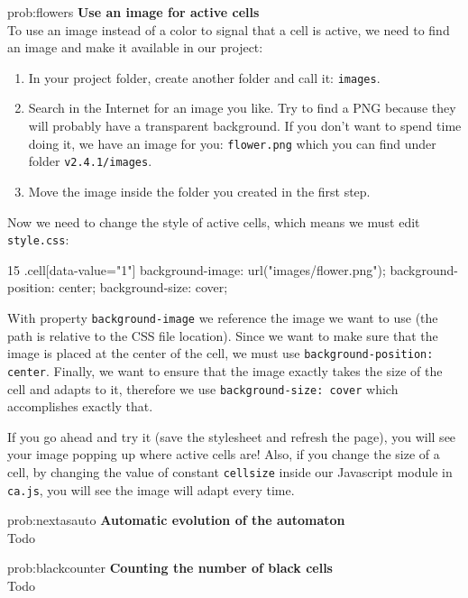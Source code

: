 \begin{sol}{prob:flowers}
\textbf{Use an image for active cells}\\
To use an image instead of a color to signal that a cell is active, we need to find an image and
make it available in our project:
\begin{enumerate}
  \item In your project folder, create another folder and call it: \texttt{images}.
  \item Search in the Internet for an image you like. Try to find a PNG because they will probably have
    a transparent background. If you don't want to spend time doing it, we have an image for you:
    \texttt{flower.png} which you can find under folder \texttt{v2.4.1/images}.
  \item Move the image inside the folder you created in the first step.
\end{enumerate}
Now we need to change the style
of active cells, which means we must edit \texttt{style.css}:
\begin{codeh1}{1}{5}
.cell[data-value="1"] {
  background-image: url("images/flower.png");
  background-position: center;
  background-size: cover;
}
\end{codeh1}
With property \texttt{background-image} we reference the image we want to use (the path is relative to the
CSS file location). Since we want to make sure that the image is placed at the center of the cell, we must use
\texttt{background-position: center}. Finally, we want to ensure that the image exactly takes the size of the
cell and adapts to it, therefore we use \texttt{background-size: cover} which accomplishes exactly that.

If you go ahead and try it (save the stylesheet and refresh the page),
you will see your image popping up where active cells are! Also, if you change the size of a cell,
by changing the value of constant \texttt{cellsize} inside our Javascript module in \texttt{ca.js},
you will see the image will adapt every time.
\end{sol}

\begin{sol}{prob:nextasauto}
\textbf{Automatic evolution of the automaton}\\
Todo
\end{sol}

\begin{sol}{prob:blackcounter}
\textbf{Counting the number of black cells}\\
Todo
\end{sol}

